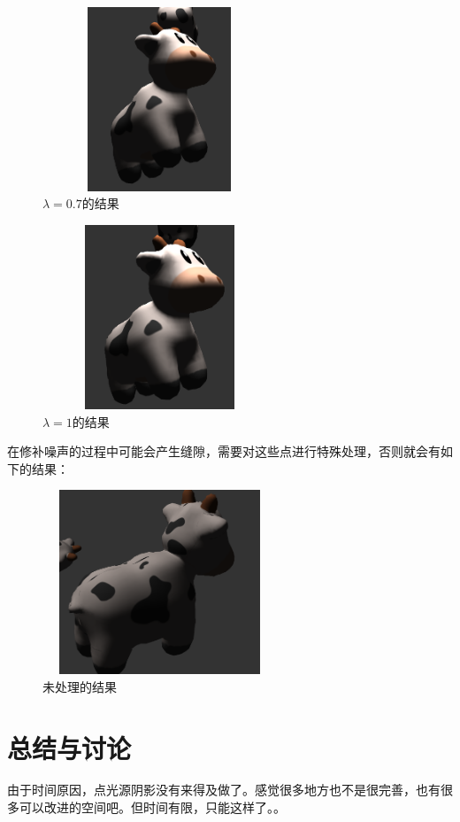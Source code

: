 \documentclass{article}
\begin{document}
	  \begin{figure}[H]
	\begin{center}
		
		\includegraphics[width=7cm,height=5.5cm]{noise 0.7}
		
		\caption{$\lambda=0.7$的结果} \label{0.7.label}
	\end{center}
\end{figure}

	  \begin{figure}[H]
	\begin{center}
		
		\includegraphics[width=7cm,height=5.5cm]{noise 1}
		
		\caption{$\lambda=1$的结果} \label{1.label}
	\end{center}
\end{figure}

  在修补噪声的过程中可能会产生缝隙，需要对这些点进行特殊处理，否则就会有如下的结果：
  
  	  \begin{figure}[H]
  	\begin{center}
  		
  		\includegraphics[width=7cm,height=5.5cm]{noise fengxi}
  		
  		\caption{未处理的结果} \label{feng.label}
  	\end{center}
  \end{figure}
	
	
	
	
	\section{总结与讨论}
	
	由于时间原因，点光源阴影没有来得及做了。感觉很多地方也不是很完善，也有很多可以改进的空间吧。但时间有限，只能这样了。。
	
	
\end{document}
